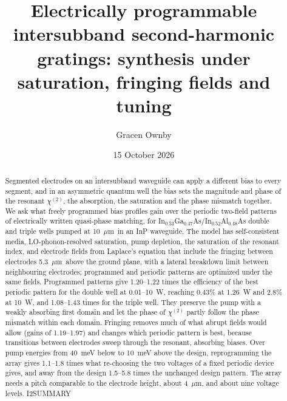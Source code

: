 \documentclass[11pt]{article}
\title{Electrically programmable intersubband second-harmonic gratings: synthesis under saturation, fringing fields and tuning}
\author{Gracen Ownby}
\affil{University of Oklahoma, Norman, Oklahoma, USA}
\date{\small 15 October 2026}
\newcommand{\chitwo}{\chi^{(2)}}
\newcommand{\um}{~$\mu$m}
\begin{document}
\maketitle

\begin{abstract}
Segmented electrodes on an intersubband waveguide can apply a different bias to every segment, and in an asymmetric quantum well the bias sets the magnitude and phase of the resonant $\chitwo$, the absorption, the saturation and the phase mismatch together. We ask what freely programmed bias profiles gain over the periodic two-field patterns of electrically written quasi-phase matching, for In$_{0.53}$Ga$_{0.47}$As/In$_{0.52}$Al$_{0.48}$As double and triple wells pumped at 10\um\ in an InP waveguide. The model has self-consistent media, LO-phonon-resolved saturation, pump depletion, the saturation of the resonant index, and electrode fields from Laplace's equation that include the fringing between electrodes 5.3\um\ above the ground plane, with a lateral breakdown limit between neighbouring electrodes; programmed and periodic patterns are optimized under the same fields. Programmed patterns give 1.20--1.22 times the efficiency of the best periodic pattern for the double well at 0.01--10~W, reaching 0.43\% at 1.26~W and 2.8\% at 10~W, and 1.08--1.43 times for the triple well. They preserve the pump with a weakly absorbing first domain and let the phase of $\chitwo$ partly follow the phase mismatch within each domain. Fringing removes much of what abrupt fields would allow (gains of 1.19--1.97) and changes which periodic pattern is best, because transitions between electrodes sweep through the resonant, absorbing biases. Over pump energies from 40~meV below to 10~meV above the design, reprogramming the array gives 1.1--1.8 times what re-choosing the two voltages of a fixed periodic device gives, and away from the design 1.5--5.8 times the unchanged design pattern. The array needs a pitch comparable to the electrode height, about 4\um, and about nine voltage levels. I2SUMMARY
\end{abstract}
\end{document}
